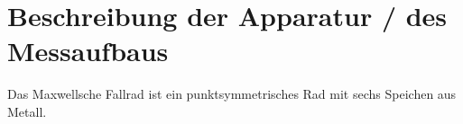 \section{Beschreibung der Apparatur / des Messaufbaus}
Das Maxwellsche Fallrad ist ein punktsymmetrisches Rad mit sechs Speichen aus Metall.